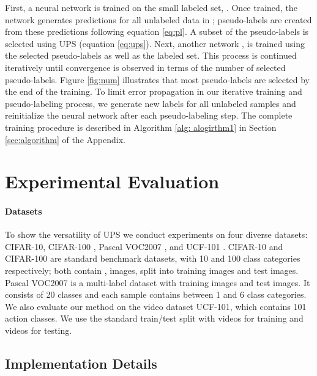 \documentclass{article} \usepackage{iclr2021_conference,times}
\begin{document}
First, a neural network  is trained on the small labeled set, . Once trained, the network generates predictions for all unlabeled data in ; pseudo-labels are created from these predictions following equation \ref{eq:pl}. A subset of the pseudo-labels is selected using UPS (equation \ref{eq:ups}). Next, another network , is trained using the selected pseudo-labels as well as the labeled set. This process is continued iteratively until convergence is observed in terms of the number of selected pseudo-labels. Figure \ref{fig:num} illustrates that most pseudo-labels are selected by the end of the training. To limit error propagation in our iterative training and pseudo-labeling process, we generate new labels for all unlabeled samples and reinitialize the neural network after each pseudo-labeling step. The complete training procedure is described in Algorithm \ref{alg: alogirthm1} in Section \ref{sec:algorithm} of the Appendix.









\section{Experimental Evaluation}


\paragraph{Datasets} To show the versatility of UPS we conduct experiments on four diverse datasets: CIFAR-10, CIFAR-100 \citep{krizhevsky2009learning}, Pascal VOC2007 \citep{pascal-voc-2007}, and UCF-101 \citep{soomro2012ucf101}. CIFAR-10 and CIFAR-100 are standard benchmark datasets, with 10 and 100 class categories respectively;
both contain ,  images, split into  training images and  test images. 
Pascal VOC2007 is a multi-label dataset with  training images and  test images. It consists of 20 classes and each sample contains between 1 and 6 class categories. We also evaluate our method on the video dataset UCF-101, which contains 101 action classes. We use the standard train/test split with  videos for training and  videos for testing. 

\subsection{Implementation Details}
\end{document}

